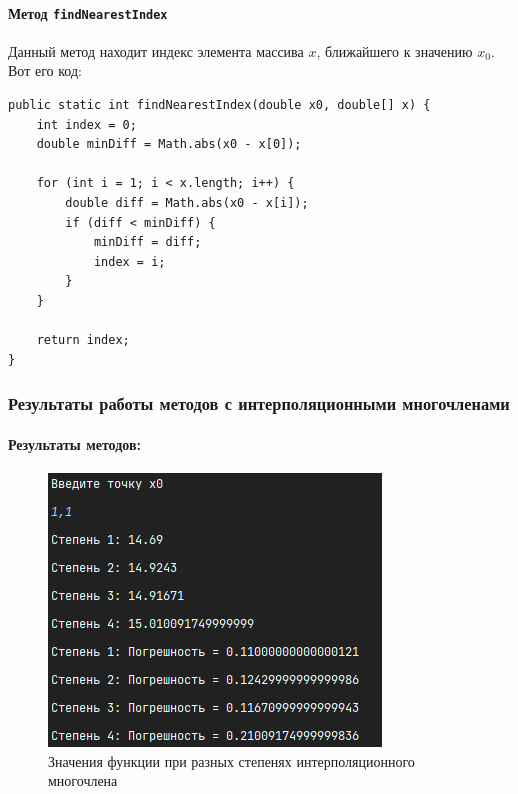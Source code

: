 \documentclass[12pt]{article}
\begin{document}
    \paragraph{Метод \texttt{findNearestIndex}}
    Данный метод находит индекс элемента массива $x$, ближайшего к значению $x_0$. Вот его код:

    \begin{verbatim}
public static int findNearestIndex(double x0, double[] x) {
    int index = 0;
    double minDiff = Math.abs(x0 - x[0]);

    for (int i = 1; i < x.length; i++) {
        double diff = Math.abs(x0 - x[i]);
        if (diff < minDiff) {
            minDiff = diff;
            index = i;
        }
    }

    return index;
}
    \end{verbatim}

    \subsubsection{Результаты работы методов с интерполяционными многочленами}

    \paragraph*{Результаты методов:}

    \clearpage

    \begin{figure}
        \centering
        \includegraphics[width=\textwidth]{image/values_interpolate_plot}
        \caption{Значения функции при разных степенях интерполяционного многочлена}

    \end{figure}
\end{document}
